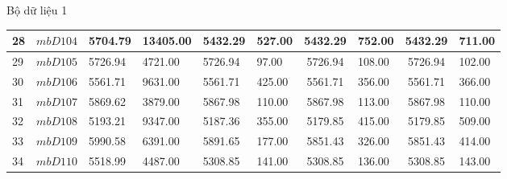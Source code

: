 \documentclass[compress]{beamer}
\begin{document}
\begin{frame}{Bộ dữ liệu 1}
\begin{longtable}{|p{0.2cm}|p{1.0cm}|p{0.55cm}|p{0.85cm}|p{0.6cm}|p{0.7cm}|c|p{0.85cm}|c|p{0.85cm}|}
28&$mbD104$ &    5704.79 &  13405.00 &    5432.29 &     527.00 &    5432.29 &     752.00 &    5432.29 &     711.00\\ \hline 
29&$mbD105$ &    5726.94 &   4721.00 &    5726.94 &      97.00 &    5726.94 &     108.00 &    5726.94 &     102.00\\ \hline 
30&$mbD106$ &    5561.71 &   9631.00 &    5561.71 &     425.00 &    5561.71 &     356.00 &    5561.71 &     366.00\\ \hline 
31&$mbD107$ &    5869.62 &   3879.00 &    5867.98 &     110.00 &    5867.98 &     113.00 &    5867.98 &     110.00\\ \hline 
32&$mbD108$ &    5193.21 &   9347.00 &    5187.36 &     355.00 &    5179.85 &     415.00 &    5179.85 &     509.00\\ \hline 
33&$mbD109$ &    5990.58 &   6391.00 &    5891.65 &     177.00 &    5851.43 &     326.00 &    5851.43 &     414.00\\ \hline 
34&$mbD110$ &    5518.99 &   4487.00 &    5308.85 &     141.00 &    5308.85 &     136.00 &    5308.85 &     143.00\\ \hline 

\end{longtable}
\normalsize
\end{frame}
\end{document}
